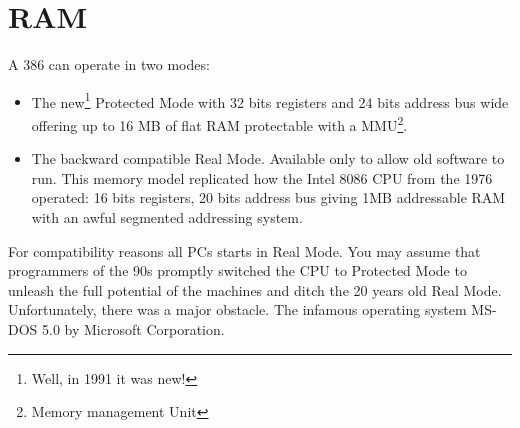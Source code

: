 \documentclass[book.tex]{subfiles}
\begin{document}
\section{RAM}
A 386 can operate in two modes:\\
\par
\begin{itemize}
  \item The new\footnote{Well, in 1991 it was new!} Protected Mode with  32 bits registers and 24 bits address bus wide offering up to 16 MB of flat RAM protectable with a MMU\footnote{Memory management Unit}.
  \item The backward compatible Real Mode. Available only to allow old software to run. This memory model replicated how the Intel 8086 CPU from the 1976 operated: 16 bits registers, 20 bits address bus giving 1MB addressable RAM with an awful segmented addressing system. 
\end{itemize}
For compatibility reasons all PCs starts in Real Mode. You may assume that programmers of the 90s promptly switched the CPU to Protected Mode to unleash the full potential of the machines and ditch the 20 years old Real Mode. Unfortunately, there was a major obstacle. The infamous operating system MS-DOS 5.0 by Microsoft Corporation.
  
\end{document}
